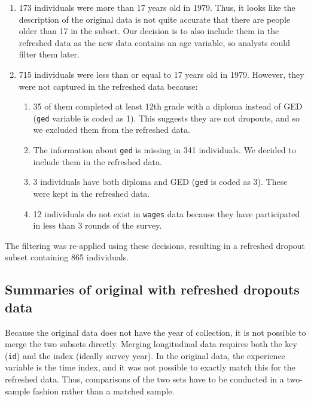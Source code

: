 \documentclass[12pt]{article}
\providecommand{\tightlist}{%
  \setlength{\itemsep}{0pt}\setlength{\parskip}{0pt}}
\begin{document}
\begin{enumerate}
\def\labelenumi{\arabic{enumi}.}
\tightlist
\item
  173 individuals were more than 17 years old in 1979. Thus, it looks like the description of the original data is not quite accurate that there are people older than 17 in the subset. Our decision is to also include them in the refreshed data as the new data contains an age variable, so analysts could filter them later.
\item
  715 individuals were less than or equal to 17 years old in 1979. However, they were not captured in the refreshed data because:

  \begin{enumerate}
  \def\labelenumii{\roman{enumii}.}
  \tightlist
  \item
    35 of them completed at least 12th grade with a diploma instead of GED (\texttt{ged} variable is coded as 1). This suggests they are not dropouts, and so we excluded them from the refreshed data.
  \item
    The information about \texttt{ged} is missing in 341 individuals. We decided to include them in the refreshed data.
  \item
    3 individuals have both diploma and GED (\texttt{ged} is coded as 3). These were kept in the refreshed data.
  \item
    12 individuals do not exist in \texttt{wages} data because they have participated in less than 3 rounds of the survey.
  \end{enumerate}
\end{enumerate}

The filtering was re-applied using these decisions, resulting in a refreshed dropout subset containing 865 individuals.

\hypertarget{summaries-of-original-with-refreshed-dropouts-data}{%
\subsection{Summaries of original with refreshed dropouts data}\label{summaries-of-original-with-refreshed-dropouts-data}}

Because the original data does not have the year of collection, it is not possible to merge the two subsets directly. Merging longitudinal data requires both the key (\texttt{id}) and the index (ideally survey year). In the original data, the experience variable is the time index, and it was not possible to exactly match this for the refreshed data. Thus, comparisons of the two sets have to be conducted in a two-sample fashion rather than a matched sample.
\end{document}
